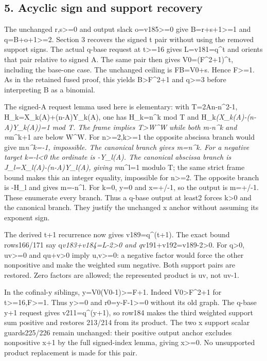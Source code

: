 \subsection{5. Acyclic sign and support
recovery}\label{acyclic-sign-and-support-recovery}

The unchanged r,s\textgreater=0 and output slack o=v185\textgreater=0
give B=r+s+1\textgreater=1 and q=B+o+1\textgreater=2. Section 3 recovers
the signed t pair without using the removed support signs. The actual
q-base request at t\textgreater=16 gives L=v181=q\^{}t and orients that
pair relative to signed A. The same pair then gives V0=(F\^{}2+1)\^{}t,
including the base-one case. The unchanged ceiling is FB=V0+s. Hence
F\textgreater=1. As in the retained fused proof, this yields
B\textgreater F\^{}2+1 and q\textgreater=3 before interpreting B as a
binomial.

The signed-A request lemma used here is elementary: with T=2An-n\^{}2-1,
H\_k=X\_k(A)+(n-A)Y\_k(A), one has H\_k=n\^{}k mod T and
H\_k\emph{(X\_k(A)-(n-A)Y\_k(A))=1 mod T. The frame implies
\textbar T\textbar\textgreater W\^{}W while both
\textbar m-n\^{}k\textbar{} and \textbar m}n\^{}k+1\textbar{} are below
W\^{}W. For n\textgreater=2,k\textgreater=1 the opposite abscissa branch
would give m\emph{n\^{}k=-1, impossible. The canonical branch gives
m=n\^{}k. For a negative target k=-l\textless0 the ordinate is -Y\_l(A).
The canonical abscissa branch is J\_l=X\_l(A)-(n-A)Y\_l(A), giving
m}n\^{}l=1 modulo T; the same strict frame bound makes this an integer
equality, impossible for n\textgreater=2. The opposite branch is -H\_l
and gives m=-n\^{}l. For k=0, y=0 and x=+/-1, so the output is m=+/-1.
These enumerate every branch. Thus a q-base output at least2 forces
k\textgreater0 and the canonical branch. They justify the unchanged x
anchor without assuming its exponent sign.

The derived t+1 recurrence now gives v189=q\^{}(t+1). The exact bound
rows166/171 say q\emph{v183+v184=L-2\textgreater0 and
q}v191+v192=v189-2\textgreater0. For q\textgreater0, uv\textgreater=0
and qu+v\textgreater0 imply u,v\textgreater=0: a negative factor would
force the other nonpositive and make the weighted sum negative. Both
support pairs are restored. Zero factors are allowed; the represented
product is uv, not uv-1.

In the cofinal-y siblings, y=V0(V0-1)\textgreater=F+1. Indeed
V0\textgreater F\^{}2+1 for t\textgreater=16,F\textgreater=1. Thus
y\textgreater=0 and r0=y-F-1\textgreater=0 without its old graph. The
q-base y+1 request gives v211=q\^{}(y+1), so row184 makes the third
weighted support sum positive and restores 213/214 from its product. The
two x support scalar guards225/226 remain unchanged: their positive
output anchor excludes nonpositive x+1 by the full signed-index lemma,
giving x\textgreater=0. No unsupported product replacement is made for
this pair.

